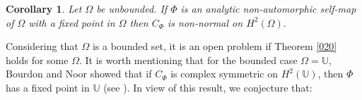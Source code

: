 \documentclass[11pt]{amsart}%
\newtheorem{cor}[thm]{Corollary}
\theoremstyle{definition}
\newtheorem{rem}[thm]{Remark}
\theoremstyle{remark}
\numberwithin{equation}{section}
\begin{document}
\begin{cor}
Let $\Omega$ be unbounded. If $\Phi$ is an analytic non-automorphic self-map
of $\Omega$ with a fixed point in $\Omega$ then
$C_{\Phi}$ is non-normal on $H^{2}(\Omega).$
\end{cor}

Considering that $\Omega$ is a bounded set, it is an open problem if Theorem \ref{020} holds for some $\Omega.$ It is worth mentioning that for the bounded case $\Omega=\mathbb{U},$
Bourdon and Noor showed that if $C_{\Phi}$ is complex symmetric on $H^2(\mathbb{U})$, then $\Phi$ has a fixed point in $\mathbb{U}$ (see \cite[Proposition, p. 106]{Wal}). In view of this result, we conjecture that:
\end{document}
